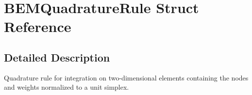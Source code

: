 \section{BEMQuadratureRule Struct Reference}
\label{structBEMQuadratureRule}


\subsection{Detailed Description}
Quadrature rule for integration on two-dimensional elements containing the nodes and weights normalized to a unit simplex. 

